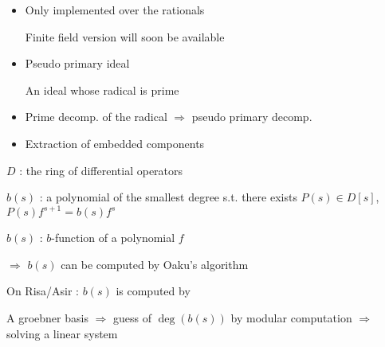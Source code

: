 \begin{slide}{}

\begin{itemize}
\item Only implemented over the rationals

Finite field version will soon be available

\item Pseudo primary ideal

An ideal whose radical is prime

\item Prime decomp. of the radical $\Rightarrow$ pseudo primary decomp.

\item Extraction of embedded components

\end{itemize}

\end{slide}

\begin{slide}{}

$D$ : the ring of differential operators

$b(s)$ : a polynomial of the smallest degree s.t.
there exists $P(s) \in D[s]$, $P(s)f^{s+1}=b(s)f^s$

$b(s)$ : $b$-function of a polynomial $f$

$\Rightarrow$ $b(s)$ can be computed by Oaku's algorithm

On Risa/Asir : $b(s)$ is computed by

A groebner basis $\Rightarrow$ guess of $\deg(b(s))$ by modular
computation $\Rightarrow$ solving a linear system
\end{slide}

